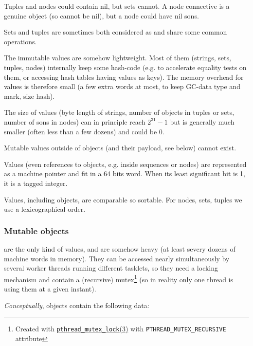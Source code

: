 Tuples and nodes could contain nil, but sets cannot. A node connective
is a genuine object (so cannot be nil), but a node could have nil
sons.

Sets and tuples are sometimes both considered as
 and share some common operations.

The immutable values are somehow lightweight. Most of them (strings,
sets, tuples, nodes) internally keep some hash-code (e.g. to
accelerate equality tests on them, or accessing hash tables having
values as keys). The memory overhead for values is therefore small (a
few extra words at most, to keep GC-data type and mark, size hash).

The size of values (byte length of strings, number of objects in
tuples or sets, number of sons in nodes) can in principle reach
$2^{31} - 1$ but is generally much smaller (often less than a few
dozens) and could be 0.

Mutable values outside of objects (and their payload, see below)
cannot exist.

Values (even references to objects, e.g. inside sequences or nodes)
are represented as a machine pointer and fit in a 64 bits word. When
its least significant bit is 1, it is a tagged integer.

Values, including objects, are comparable so sortable. For nodes,
sets, tuples we use a lexicographical order.

\subsubsection{Mutable objects}
\label{subsubsec:objects}

 are the only kind of 
values, and are somehow heavy (at least severy dozens of machine words
in memory). They can be accessed nearly simultaneously by several
worker threads running different tasklets, so they need a locking
mechanism and contain a (recursive) mutex\footnote{Created with
  \href{http://man7.org/linux/man-pages/man3/pthread\_mutex\_lock.3p.html}{\texttt{pthread\_mutex\_lock}(3)}
  with \texttt{PTHREAD\_MUTEX\_RECURSIVE} attribute} (so in reality
only one thread is using them at a given instant).

\medskip

\emph{Conceptually}, objects contain the following data:

